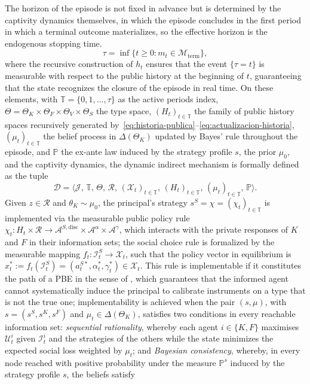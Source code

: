\documentclass[review,authoryear,12pt]{elsarticle}
\theoremstyle{plain}
\theoremstyle{definition}
\newcommand{\Prob}{\mathbb{P}}
\newcommand{\ThetaK}{\Theta_K}
\newcommand{\1}{\mathbf{1}}
\begin{document}
The horizon of the episode is not fixed in advance but is determined by the captivity dynamics themselves, in which the episode concludes in the first period in which a terminal outcome materializes, so the effective horizon is the endogenous stopping time.
\begin{equation}
\tau=\inf\{t\geq 0:m_t\in\mathcal{M}_{\mathrm{term}}\},\label{eq:stopping-time}
\end{equation}
where the recursive construction of $h_t$ ensures that the event $\{\tau=t\}$ is measurable with respect to the public history at the beginning of $t$, guaranteeing that the state recognizes the closure of the episode in real time. On these elements, with $\mathbb{T}=\{0,1,\ldots,\tau\}$ as the active periods index, $\Theta=\ThetaK\times\Theta_F\times\Theta_V\times\Theta_S$ the type space, $(H_t)_{t\in\mathbb{T}}$ the family of public history spaces recursively generated by~\eqref{eq:historia-publica}--\eqref{eq:actualizacion-historia}, $(\mu_t)_{t\in\mathbb{T}}$ the belief process in $\Delta(\ThetaK)$ updated by Bayes' rule throughout the episode, and $\Prob$ the ex-ante law induced by the strategy profile $s$, the prior $\mu_0$, and the captivity dynamics, the dynamic indirect mechanism is formally defined as the tuple
\[
\mathcal{D}=\bigl\langle\mathcal{J},\,\mathbb{T},\,\Theta,\,\mathcal{R},\,(\mathcal{X}_t)_{t\in\mathbb{T}},\,(H_t)_{t\in\mathbb{T}},\,(\mu_t)_{t\in\mathbb{T}},\,\Prob\bigr\rangle.
\]
Given $z\in\mathcal{R}$ and $\theta_K\sim\mu_0$, the principal's strategy $s^S=\chi=(\chi_t)_{t\in\mathbb{T}}$ is implemented via the measurable public policy rule $\chi_t\colon H_t\times\mathcal{R}\to\mathcal{A}^{S,\mathrm{disc}}\times\mathcal{A}^{\alpha}\times\mathcal{A}^{\gamma}$, which interacts with the private responses of $K$ and $F$ in their information sets; the social choice rule is formalized by the measurable mapping $f_t\colon\mathcal{I}_t^S\to\mathcal{X}_t$, such that the policy vector in equilibrium is $x_t^\ast:=f_t(\mathcal{I}_t^S)=(a_t^{S\ast},\alpha_t^\ast,\gamma_t^\ast)\in\mathcal{X}_t$. This rule is implementable if it constitutes the path of a PBE in the sense of \citet{FudenbergTirole1991}, which guarantees that the informed agent cannot systematically induce the principal to calibrate instruments on a type that is not the true one; implementability is achieved when the pair $(s,\mu)$, with $s=(s^S,s^K,s^F)$ and $\mu_t\in\Delta(\ThetaK)$, satisfies two conditions in every reachable information set: \emph{sequential rationality}, whereby each agent $i\in\{K,F\}$ maximises $\mathcal{U}_t^i$ given $\mathcal{I}_t^i$ and the strategies of the others while the state minimizes the expected social loss weighted by $\mu_t$; and \emph{Bayesian consistency}, whereby, in every node reached with positive probability under the measure $\Prob^s$ induced by the strategy profile $s$, the beliefs satisfy
\end{document}

